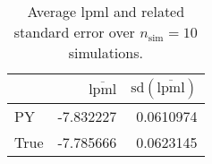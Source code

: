 \begin{table}[H]

\caption{Average lpml and related standard error over $n_{\text{sim}} = 10$ simulations.}
\centering
\begin{tabular}[t]{lrr}
\toprule
  & $\overbar{\text{lpml}}$ & $\text{sd}(\overbar{\text{lpml}})$\\
\midrule
PY & -7.832227 & 0.0610974\\
True & -7.785666 & 0.0623145\\
\bottomrule
\end{tabular}
\end{table}